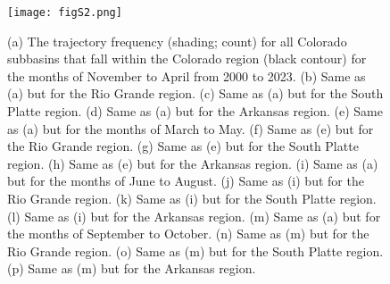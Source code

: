 \documentclass[draft,jgrga]{agutexSI2019}
\begin{document}
\begin{figure}
\noindent\texttt{[image: figS2.png]}
\caption{(a) The trajectory frequency (shading; count) for all Colorado subbasins that fall within the Colorado region (black contour) for the months of November to April from 2000 to 2023. (b) Same as (a) but for the Rio Grande region. (c) Same as (a) but for the South Platte region. (d) Same as (a) but for the Arkansas region. (e) Same as (a) but for the months of March to May. (f) Same as (e) but for the Rio Grande region. (g) Same as (e) but for the South Platte region. (h) Same as (e) but for the Arkansas region. (i) Same as (a) but for the months of June to August. (j) Same as (i) but for the Rio Grande region. (k) Same as (i) but for the South Platte region. (l) Same as (i) but for the Arkansas region. (m) Same as (a) but for the months of September to October. (n) Same as (m) but for the Rio Grande region. (o) Same as (m) but for the South Platte region. (p) Same as (m) but for the Arkansas region.}
\label{fig:supp:spaghetti_ssn}
\end{figure}
\end{document}
